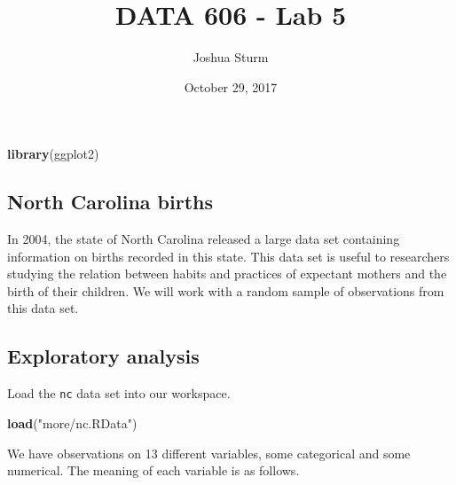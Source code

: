\documentclass[]{article}
\title{DATA 606 - Lab 5}
\author{Joshua Sturm}
\date{October 29, 2017}
\newenvironment{Shaded}{\begin{snugshade}}{\end{snugshade}}
\newcommand{\KeywordTok}[1]{\textcolor[rgb]{0.13,0.29,0.53}{\textbf{#1}}}
\newcommand{\StringTok}[1]{\textcolor[rgb]{0.31,0.60,0.02}{#1}}
\newcommand{\NormalTok}[1]{#1}
\begin{document}
\maketitle

\begin{Shaded}
\begin{Highlighting}[]
\KeywordTok{library}\NormalTok{(ggplot2)}
\end{Highlighting}
\end{Shaded}

\subsection{North Carolina births}\label{north-carolina-births}

In 2004, the state of North Carolina released a large data set
containing information on births recorded in this state. This data set
is useful to researchers studying the relation between habits and
practices of expectant mothers and the birth of their children. We will
work with a random sample of observations from this data set.

\subsection{Exploratory analysis}\label{exploratory-analysis}

Load the \texttt{nc} data set into our workspace.

\begin{Shaded}
\begin{Highlighting}[]
\KeywordTok{load}\NormalTok{(}\StringTok{"more/nc.RData"}\NormalTok{)}
\end{Highlighting}
\end{Shaded}

We have observations on 13 different variables, some categorical and
some numerical. The meaning of each variable is as follows.
\end{document}
